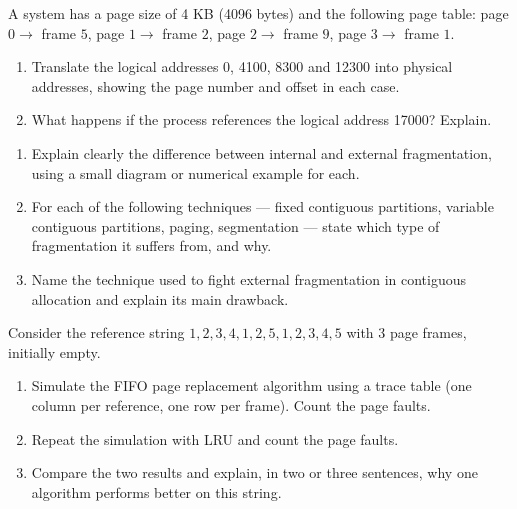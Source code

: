 \documentclass[11pt]{article}
\newcounter{popsec}
\newcounter{popsub}
\newcommand{\courssub}[1]{%
  \stepcounter{popsub}%
  \par\vspace{9pt}\noindent{\popxbold\fontsize{11.5}{13}\selectfont\color{popink}{\color{poporange}\thepopsec.\thepopsub}\hspace{6pt}#1}\par\nopagebreak\vspace{4pt}
}
\begin{document}
\begin{exercice}
A system has a page size of 4 KB (4096 bytes) and the following page table: page $0 \to$ frame $5$, page $1 \to$ frame $2$, page $2 \to$ frame $9$, page $3 \to$ frame $1$.
\begin{enumerate}
\item Translate the logical addresses 0, 4100, 8300 and 12300 into physical addresses, showing the page number and offset in each case.
\item What happens if the process references the logical address 17000? Explain.
\end{enumerate}
\end{exercice}

\begin{exercice}[Fragmentation]
\begin{enumerate}
\item Explain clearly the difference between internal and external fragmentation, using a small diagram or numerical example for each.
\item For each of the following techniques — fixed contiguous partitions, variable contiguous partitions, paging, segmentation — state which type of fragmentation it suffers from, and why.
\item Name the technique used to fight external fragmentation in contiguous allocation and explain its main drawback.
\end{enumerate}
\end{exercice}

\begin{exercice}
Consider the reference string $1, 2, 3, 4, 1, 2, 5, 1, 2, 3, 4, 5$ with 3 page frames, initially empty.
\begin{enumerate}
\item Simulate the FIFO page replacement algorithm using a trace table (one column per reference, one row per frame). Count the page faults.
\item Repeat the simulation with LRU and count the page faults.
\item Compare the two results and explain, in two or three sentences, why one algorithm performs better on this string.
\end{enumerate}
\end{exercice}

\courssub{I prepare for the GCE}
\end{document}
